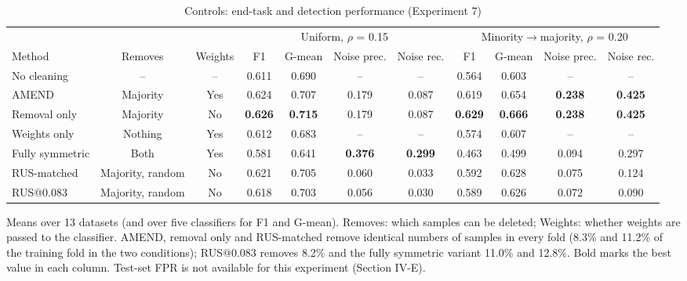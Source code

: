 \documentclass[conference]{IEEEtran}
\begin{document}
\begin{table}[!t]
\centering
\footnotesize
\caption{Controls: end-task and detection performance (Experiment 7)}
\label{tab:9}
\setlength{\tabcolsep}{3.5pt}
\begin{adjustbox}{max width=\linewidth}
\begin{tabular}{lcccccccccc}
\hline
&  &  & \multicolumn{4}{c}{Uniform, $\rho $ = 0.15} & \multicolumn{4}{c}{Minority$\rightarrow $majority, $\rho $ = 0.20} \\
Method & Removes & Weights & F1 & G-mean & Noise prec. & Noise rec. & F1 & G-mean & Noise prec. & Noise rec. \\
\hline
No cleaning & -- & -- & 0.611 & 0.690 & -- & -- & 0.564 & 0.603 & -- & -- \\
AMEND & Majority & Yes & 0.624 & 0.707 & 0.179 & 0.087 & 0.619 & 0.654 & \textbf{0.238} & \textbf{0.425} \\
Removal only & Majority & No & \textbf{0.626} & \textbf{0.715} & 0.179 & 0.087 & \textbf{0.629} & \textbf{0.666} & \textbf{0.238} & \textbf{0.425} \\
Weights only & Nothing & Yes & 0.612 & 0.683 & -- & -- & 0.574 & 0.607 & -- & -- \\
Fully symmetric & Both & Yes & 0.581 & 0.641 & \textbf{0.376} & \textbf{0.299} & 0.463 & 0.499 & 0.094 & 0.297 \\
RUS-matched & Majority, random & No & 0.621 & 0.705 & 0.060 & 0.033 & 0.592 & 0.628 & 0.075 & 0.124 \\
RUS@0.083 & Majority, random & No & 0.618 & 0.703 & 0.056 & 0.030 & 0.589 & 0.626 & 0.072 & 0.090 \\
\hline
\end{tabular}
\end{adjustbox}
\par\vspace{3pt}
\begin{minipage}{\linewidth}\scriptsize Means over 13 datasets (and over five classifiers for F1 and G-mean). Removes: which samples can be deleted; Weights: whether weights are passed to the classifier. AMEND, removal only and RUS-matched remove identical numbers of samples in every fold (8.3\% and 11.2\% of the training fold in the two conditions); RUS@0.083 removes 8.2\% and the fully symmetric variant 11.0\% and 12.8\%. Bold marks the best value in each column. Test-set FPR is not available for this experiment (Section IV-E).\end{minipage}
\end{table}
\end{document}
